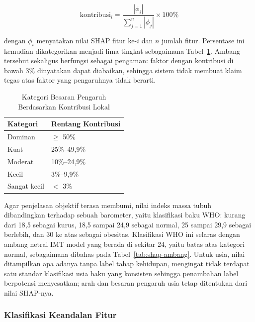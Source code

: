 \begin{equation}
\label{eq:share-lokal}
\text{kontribusi}_i = \frac{|\phi_i|}{\sum_{j=1}^{n} |\phi_j|} \times 100\%
\end{equation}

\noindent dengan $\phi_i$ menyatakan nilai SHAP fitur ke-$i$ dan $n$ jumlah fitur. Persentase ini kemudian dikategorikan menjadi lima tingkat sebagaimana Tabel~\ref{tab:kategori-magnitudo}. Ambang tersebut sekaligus berfungsi sebagai pengaman: faktor dengan kontribusi di bawah 3\% dinyatakan dapat diabaikan, sehingga sistem tidak membuat klaim tegas atas faktor yang pengaruhnya tidak berarti.

\begin{table}[htbp]
    \centering
    \caption{Kategori Besaran Pengaruh Berdasarkan Kontribusi Lokal}
    \label{tab:kategori-magnitudo}
    \begin{tabular}{@{}ll@{}}
        \toprule
        \textbf{Kategori} & \textbf{Rentang Kontribusi} \\
        \midrule
        Dominan       & $\geq$ 50\% \\
        Kuat          & 25\%--49,9\% \\
        Moderat       & 10\%--24,9\% \\
        Kecil         & 3\%--9,9\% \\
        Sangat kecil  & $<$ 3\% \\
        \bottomrule
    \end{tabular}
\end{table}

Agar penjelasan objektif terasa membumi, nilai indeks massa tubuh dibandingkan terhadap sebuah barometer, yaitu klasifikasi baku WHO: kurang dari 18,5 sebagai kurus, 18,5 sampai 24,9 sebagai normal, 25 sampai 29,9 sebagai berlebih, dan 30 ke atas sebagai obesitas. Klasifikasi WHO ini selaras dengan ambang netral IMT model yang berada di sekitar 24, yaitu batas atas kategori normal, sebagaimana dibahas pada Tabel~\ref{tab:shap-ambang}. Untuk usia, nilai ditampilkan apa adanya tanpa label tahap kehidupan, mengingat tidak terdapat satu standar klasifikasi usia baku yang konsisten sehingga penambahan label berpotensi menyesatkan; arah dan besaran pengaruh usia tetap ditentukan dari nilai SHAP-nya.

\subsubsection{Klasifikasi Keandalan Fitur}

